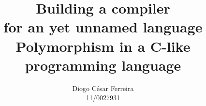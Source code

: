 \documentclass[12pt]{article}
\begin{document}
\title{Building a compiler\\\Large for an yet unnamed language\\\small Polymorphism in a C-like programming language}
\author{Diogo César Ferreira\\11/0027931}

\maketitle


 
 
 
 
 
\clearpage









\printbibliography
\end{document}
